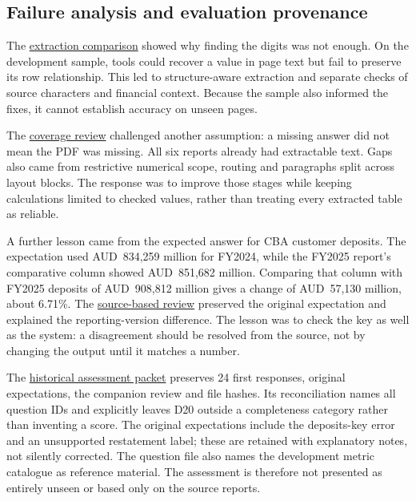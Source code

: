 \subsection{Failure analysis and evaluation provenance}
The \href{https://github.com/AyushiNegi20/COSC2669-WIL-PROJECT/blob/report-submission-2026-10-25/fintrace/docs/BANKING_PDF_EXTRACTION.md}{extraction comparison} showed why finding the digits was not enough. On the development sample, tools could recover a value in page text but fail to preserve its row relationship. This led to structure-aware extraction and separate checks of source characters and financial context. Because the sample also informed the fixes, it cannot establish accuracy on unseen pages.

The \href{https://github.com/AyushiNegi20/COSC2669-WIL-PROJECT/blob/report-submission-2026-10-25/fintrace/reports/coverage/REVIEW.md}{coverage review} challenged another assumption: a missing answer did not mean the PDF was missing. All six reports already had extractable text. Gaps also came from restrictive numerical scope, routing and paragraphs split across layout blocks. The response was to improve those stages while keeping calculations limited to checked values, rather than treating every extracted table as reliable.

A further lesson came from the expected answer for CBA customer deposits. The expectation used AUD~834,259 million for FY2024, while the FY2025 report's comparative column showed AUD~851,682 million. Comparing that column with FY2025 deposits of AUD~908,812 million gives a change of AUD~57,130 million, about 6.71\%. The \href{https://github.com/AyushiNegi20/COSC2669-WIL-PROJECT/blob/report-submission-2026-10-25/fintrace/reports/coverage/RELEASE_CANDIDATE.md}{source-based review} preserved the original expectation and explained the reporting-version difference. The lesson was to check the key as well as the system: a disagreement should be resolved from the source, not by changing the output until it matches a number.

The \href{https://github.com/AyushiNegi20/COSC2669-WIL-PROJECT/tree/report-submission-2026-10-25/report/evidence/historical-release-20260926T233529Z}{historical assessment packet} preserves 24 first responses, original expectations, the companion review and file hashes. Its reconciliation names all question IDs and explicitly leaves D20 outside a completeness category rather than inventing a score. The original expectations include the deposits-key error and an unsupported restatement label; these are retained with explanatory notes, not silently corrected. The question file also names the development metric catalogue as reference material. The assessment is therefore not presented as entirely unseen or based only on the source reports.


